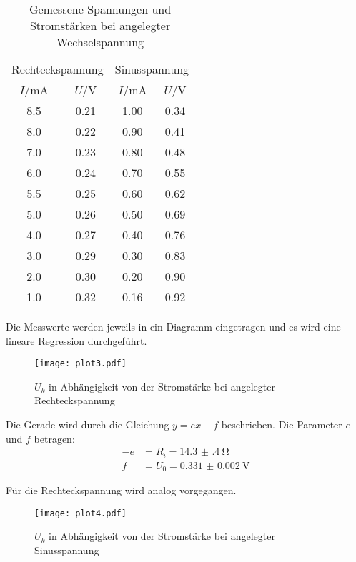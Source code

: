 \begin{table}[H]
  \centering
  \caption{Gemessene Spannungen und Stromstärken bei angelegter Wechselspannung}
  \label{tab:wechselspannung}
  \begin{tabular}{c c c c}
    \toprule
    \multicolumn{2}{c}{Rechteckspannung} & \multicolumn{2}{c}{Sinusspannung} \\
    \cmidrule(lr){1-2}\cmidrule(lr){3-4}
    $I/$mA & $U/$V & $I/$mA & $U/$V \\
    \midrule
    8.5  &  0.21  &  1.00  &   0.34 \\
    8.0  &  0.22  &  0.90  &   0.41 \\
    7.0  &  0.23  &  0.80  &   0.48 \\
    6.0  &  0.24  &  0.70  &   0.55 \\
    5.5  &  0.25  &  0.60  &   0.62 \\
    5.0  &  0.26  &  0.50  &   0.69 \\
    4.0  &  0.27  &  0.40  &   0.76 \\
    3.0  &  0.29  &  0.30  &   0.83 \\
    2.0  &  0.30  &  0.20  &   0.90 \\
    1.0  &  0.32  &  0.16  &   0.92 \\
    \bottomrule
  \end{tabular}
\end{table}

Die Messwerte werden jeweils in ein Diagramm eingetragen und es wird eine lineare Regression durchgeführt.

\begin{figure}[H]
  \centering
  \texttt{[image: plot3.pdf]}
  \caption{$U_k$ in Abhängigkeit von der Stromstärke bei angelegter Rechteckspannung}
  \label{fig:plot3}
\end{figure}

Die Gerade wird durch die Gleichung $y = ex + f$ beschrieben. Die Parameter $e$ und $f$ betragen:
\begin{align*}
  -e &= R_i = \SI{14.3(4)}{\ohm} \\
  f &= U_0 = \SI{0.331(2)}{\volt}
\end{align*}

Für die Rechteckspannung wird analog vorgegangen.

\begin{figure}[H]
  \centering
  \texttt{[image: plot4.pdf]}
  \caption{$U_k$ in Abhängigkeit von der Stromstärke bei angelegter Sinusspannung}
  \label{fig:plot4}
\end{figure}


